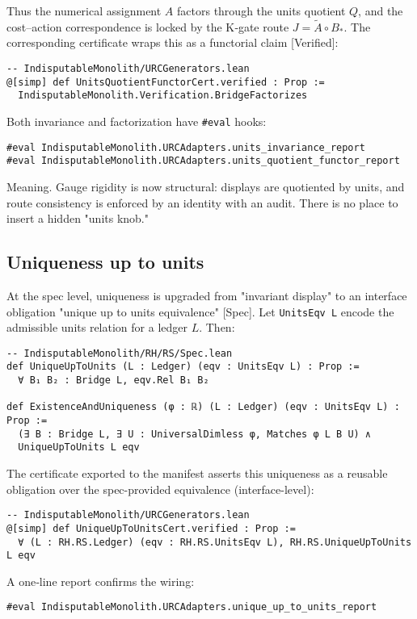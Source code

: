 \documentclass[11pt,a4paper,twoside]{article}
\numberwithin{equation}{section}
\newcommand{\Atilde}{\tilde{A}}
\newcommand{\Bstar}{B_*}
\theoremstyle{customthm}
\theoremstyle{customdef}
\theoremstyle{customrem}
\begin{document}
Thus the numerical assignment \(A\) factors through the units quotient \(Q\), and the cost–action correspondence is locked by the K‐gate route \(J=\Atilde\circ \Bstar\). The corresponding certificate wraps this as a functorial claim [Verified]:
\begin{lstlisting}
-- IndisputableMonolith/URCGenerators.lean
@[simp] def UnitsQuotientFunctorCert.verified : Prop :=
  IndisputableMonolith.Verification.BridgeFactorizes
\end{lstlisting}

Both invariance and factorization have \texttt{\#eval} hooks:
\begin{lstlisting}
#eval IndisputableMonolith.URCAdapters.units_invariance_report
#eval IndisputableMonolith.URCAdapters.units_quotient_functor_report
\end{lstlisting}

Meaning. Gauge rigidity is now structural: displays are quotiented by units, and route consistency is enforced by an identity with an audit. There is no place to insert a hidden "units knob."

\subsection{Uniqueness up to units}

At the spec level, uniqueness is upgraded from "invariant display" to an interface obligation "unique up to units equivalence" [Spec]. Let \texttt{UnitsEqv L} encode the admissible units relation for a ledger \(L\). Then:
\begin{lstlisting}
-- IndisputableMonolith/RH/RS/Spec.lean
def UniqueUpToUnits (L : Ledger) (eqv : UnitsEqv L) : Prop :=
  ∀ B₁ B₂ : Bridge L, eqv.Rel B₁ B₂

def ExistenceAndUniqueness (φ : ℝ) (L : Ledger) (eqv : UnitsEqv L) : Prop :=
  (∃ B : Bridge L, ∃ U : UniversalDimless φ, Matches φ L B U) ∧
  UniqueUpToUnits L eqv
\end{lstlisting}

The certificate exported to the manifest asserts this uniqueness as a reusable obligation over the spec-provided equivalence (interface-level):
\begin{lstlisting}
-- IndisputableMonolith/URCGenerators.lean
@[simp] def UniqueUpToUnitsCert.verified : Prop :=
  ∀ (L : RH.RS.Ledger) (eqv : RH.RS.UnitsEqv L), RH.RS.UniqueUpToUnits L eqv
\end{lstlisting}

A one‐line report confirms the wiring:
\begin{lstlisting}
#eval IndisputableMonolith.URCAdapters.unique_up_to_units_report
\end{lstlisting}
\end{document}
